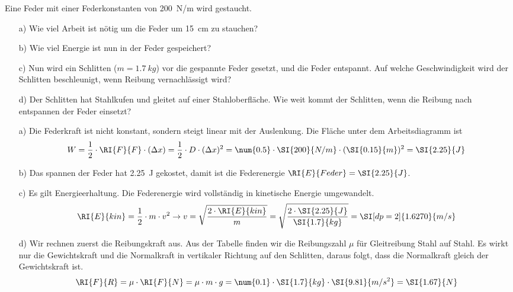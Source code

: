 \begin{aufgabe}
	Eine Feder mit einer Federkonstanten von \SI{200}{N/m} wird gestaucht.
	\begin{itemize}
		\item [a)] Wie viel Arbeit ist nötig um die Feder um \SI{15}{cm} zu stauchen?
		\item [b)] Wie viel Energie ist nun in der Feder gespeichert?
		\item [c)] Nun wird ein Schlitten ($m=\SI{1.7}{kg}$) vor die gespannte Feder gesetzt, und die Feder entspannt.
			Auf welche Geschwindigkeit wird der Schlitten beschleunigt, wenn Reibung vernachlässigt wird?
		\item [d)] Der Schlitten hat Stahlkufen und gleitet auf einer Stahloberfläche. Wie weit kommt der Schlitten, wenn
			die Reibung nach entspannen der Feder einsetzt?
	\end{itemize}
	\begin{loesung}
		\begin{itemize}
			\item [a)] Die Federkraft ist nicht konstant, sondern steigt linear mit der Auslenkung.
				Die Fläche unter dem Arbeitsdiagramm ist 
				\begin{eqnarray*}
				W=\frac{1}{2}\cdot\RI{F}{F}\cdot(\Delta x)=\frac{1}{2}\cdot D\cdot (\Delta x)^2=\num{0.5}\cdot\SI{200}{N/m}\cdot(\SI{0.15}{m})^2=\SI{2.25}{J}
				\end{eqnarray*}
			\item[b)] Das spannen der Feder hat \SI{2.25}{J} gekostet, damit ist die Federenergie $\RI{E}{Feder}=\SI{2.25}{J}$.
			\item[c)] Es gilt Energieerhaltung. Die Federenergie wird vollständig in kinetische Energie umgewandelt.
				\begin{eqnarray*}
					\RI{E}{kin}=\frac{1}{2}\cdot m\cdot v^2 \to v=\sqrt{\frac{2\cdot \RI{E}{kin}}{m}} =\sqrt{\frac{2\cdot\SI{2.25}{J}}{\SI{1.7}{kg}}}=\SI[dp=2]{1.6270}{m/s}
				\end{eqnarray*}
			\item[d)] Wir rechnen zuerst die Reibungskraft aus. Aus der Tabelle finden wir die Reibungszahl $\mu$ für Gleitreibung Stahl auf Stahl.
				Es wirkt nur die Gewichtskraft und die Normalkraft in vertikaler Richtung auf den Schlitten, 
				daraus folgt, dass die Normalkraft gleich
				der Gewichtskraft ist.
				\begin{eqnarray*}
					\RI{F}{R}=\mu\cdot\RI{F}{N}=\mu\cdot m\cdot g=\num{0.1}\cdot\SI{1.7}{kg}\cdot\SI{9.81}{m/s^2}=\SI{1.67}{N}
				\end{eqnarray*}

\end{itemize}
\end{loesung}
\end{aufgabe}
